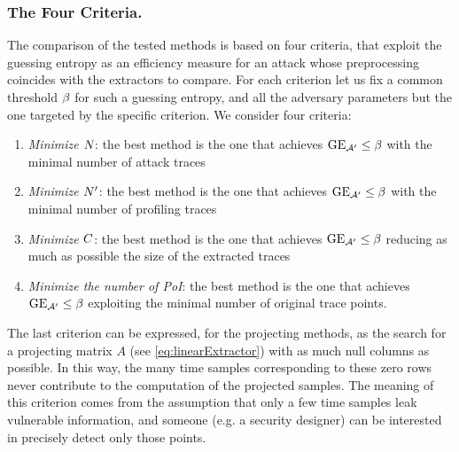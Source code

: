 \subsubsection{The Four Criteria.}
The comparison of the tested methods is based on four criteria, that exploit the guessing entropy as an efficiency measure for an attack whose preprocessing coincides with the extractors to compare. For each criterion let us fix a common threshold $\threshold$ for such a guessing entropy, and all the adversary parameters but the one targeted by the specific criterion. We consider four criteria: 
\begin{enumerate}
\item {\em Minimize $\numTraces[]$}: the best method is the one that achieves $\guessingEntropy_{\adversary'}\leq \threshold$ with the minimal number of attack traces
\item {\em Minimize $\numTraces[]'$}: the best method is the one that achieves $\guessingEntropy_{\adversary'}\leq \threshold$ with the minimal number of profiling traces
\item {\em Minimize $\newTraceLength$}: the best method is the one that achieves $\guessingEntropy_{\adversary'}\leq \threshold$ reducing as much as possible the size of the extracted traces
\item {\em Minimize the number of PoI}: the best method is the one that achieves $\guessingEntropy_{\adversary'}\leq \threshold$ exploiting the minimal number of original trace points.
\end{enumerate}
The last criterion can be expressed, for the projecting methods, as the search for a projecting matrix $A$ (see \eqref{eq:linearExtractor}) with as much null columns as possible. In this way, the many time samples corresponding to these zero rows never contribute to the computation of the projected samples. The meaning of this criterion comes from the assumption that only a few time samples leak vulnerable information, and someone (e.g. a security designer) can be interested in precisely detect only those points.













